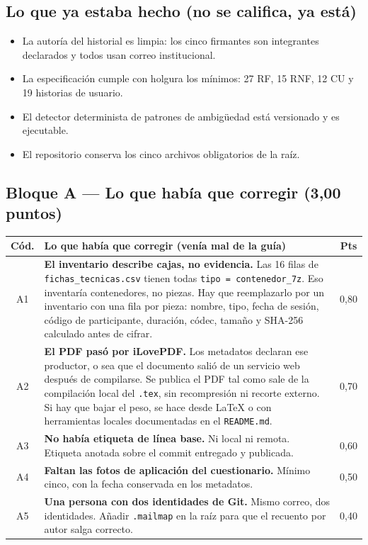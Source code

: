 \documentclass[11pt,a4paper]{article}
\newcommand{\cabA}{\toprule \textbf{Cód.} & \textbf{Lo que había que corregir (venía mal de la guía)} & \textbf{Pts} \\ \midrule}
\begin{document}
\subsection*{Lo que ya estaba hecho (no se califica, ya está)}
\begin{itemize}
    \item La autoría del historial es limpia: los cinco firmantes son integrantes declarados y todos usan correo institucional.
    \item La especificación cumple con holgura los mínimos: 27 RF, 15 RNF, 12 CU y 19 historias de usuario.
    \item El detector determinista de patrones de ambigüedad está versionado y es ejecutable.
    \item El repositorio conserva los cinco archivos obligatorios de la raíz.
\end{itemize}

\subsection*{Bloque A — Lo que había que corregir (3,00 puntos)}
\begin{xltabular}{\textwidth}{@{}c>{\raggedright\arraybackslash}X c@{}}
\cabA
A1 & \textbf{El inventario describe cajas, no evidencia.} Las 16 filas de \texttt{fichas\_tecnicas.csv} tienen todas \texttt{tipo = contenedor\_7z}. Eso inventaría contenedores, no piezas. Hay que reemplazarlo por un inventario con una fila por pieza: nombre, tipo, fecha de sesión, código de participante, duración, códec, tamaño y SHA-256 calculado antes de cifrar. & 0{,}80 \\ \addlinespace
A2 & \textbf{El PDF pasó por iLovePDF.} Los metadatos declaran ese productor, o sea que el documento salió de un servicio web después de compilarse. Se publica el PDF tal como sale de la compilación local del \texttt{.tex}, sin recompresión ni recorte externo. Si hay que bajar el peso, se hace desde \LaTeX{} o con herramientas locales documentadas en el \texttt{README.md}. & 0{,}70 \\ \addlinespace
A3 & \textbf{No había etiqueta de línea base.} Ni local ni remota. Etiqueta anotada sobre el commit entregado y publicada. & 0{,}60 \\ \addlinespace
A4 & \textbf{Faltan las fotos de aplicación del cuestionario.} Mínimo cinco, con la fecha conservada en los metadatos. & 0{,}50 \\ \addlinespace
A5 & \textbf{Una persona con dos identidades de Git.} Mismo correo, dos identidades. Añadir \texttt{.mailmap} en la raíz para que el recuento por autor salga correcto. & 0{,}40 \\
\bottomrule
\end{xltabular}
\end{document}
